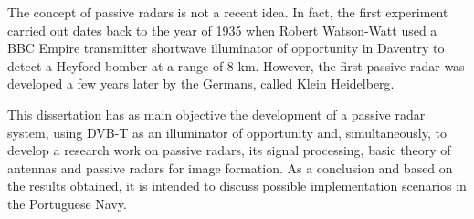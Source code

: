 \begin{abstractotherlanguage}




The concept of passive radars is not a recent idea. In fact, the first experiment carried out dates back to the year of 1935 when Robert Watson-Watt used a BBC Empire transmitter shortwave illuminator of opportunity in Daventry to detect a Heyford bomber at a range of 8 km. However, the first passive radar was developed a few years later by the Germans, called Klein Heidelberg.\par 
This dissertation has as main objective the development of a passive radar system, using \gls{DVB-T} as an illuminator of opportunity and, simultaneously, to develop a research work on passive radars, its signal processing, basic theory of antennas and passive radars for image formation. As a conclusion and based on the results obtained, it is intended to discuss possible implementation scenarios in the Portuguese Navy.


\end{abstractotherlanguage}




\tableofcontents %

\listoffigures %

\listoftables %

\listofalgorithms %


